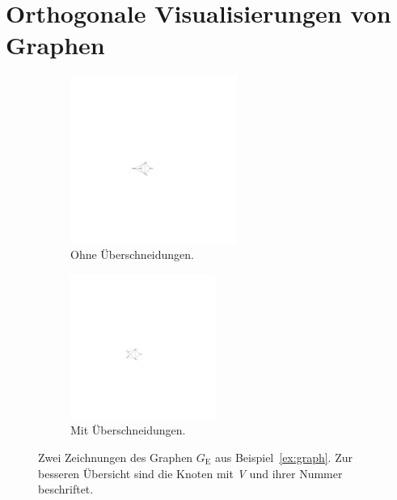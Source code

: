 \documentclass[a4paper]{scrreprt}
\theoremstyle{definition}
\begin{document}
\section{Orthogonale Visualisierungen von Graphen}
\label{sec:orthogonalDrawings}

\begin{figure}[h]
        \centering
        \begin{subfigure}[b]{0.4\textwidth}
                \centering
                \includegraphics[width=0.6\textwidth]{exampleA_straightline}
                \caption{Ohne Überschneidungen.}
                \label{fig:exampleAstraightline}
        \end{subfigure}
        \quad
        \begin{subfigure}[b]{0.4\textwidth}
                \centering
                \includegraphics[width=0.52\textwidth]{exampleA_straightlineNonplanar}
                \caption{Mit Überschneidungen.}
                \label{fig:exampleAstraightlineNonplanar}
        \end{subfigure}
        \caption{Zwei Zeichnungen des Graphen $G_\text{E}$ aus Beispiel~\ref{ex:graph}. Zur besseren Übersicht sind die Knoten mit \emph{V} und ihrer Nummer beschriftet.}
\end{figure}
\end{document}
